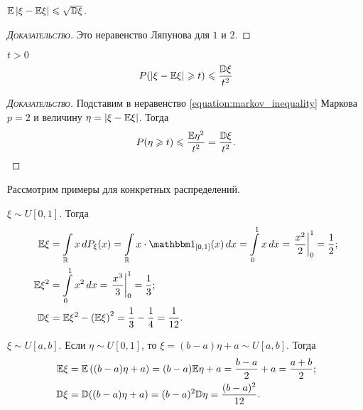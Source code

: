\documentclass[../main.tex]{subfiles}
\begin{document}
\begin{prop}
 $ \mathbb E \left| \xi - \mathbb E\xi \right| \leqslant \sqrt{\mathbb D\xi} $.
\end{prop}
\begin{proof}[\normalfont\textsc{Доказательство}]
 Это неравенство Ляпунова для $ 1 $ и $ 2 $.
\end{proof}

\begin{prop}
 \label{proposition:chebyshev_inequality}
 $ t > 0 $
 \begin{align}
  \label{equation:chebyshev_inequality}
  P(\left| \xi - \mathbb E\xi \right| \geqslant t) \leqslant \frac{\mathbb D\xi}{t^{2}}
 \end{align} 
\end{prop}
\begin{proof}[\normalfont\textsc{Доказательство}]
 Подставим в неравенство \eqref{equation:markov_inequality} Маркова $ p=2 $ и величину $ \eta = \left| \xi - \mathbb E\xi \right| $. Тогда
 \begin{align*}
  P(\eta \geqslant t) \leqslant \frac{\mathbb E\eta^{2}}{t^{2}} = \frac{\mathbb D\xi}{t^{2}}.
 \end{align*} 
\end{proof}

Рассмотрим примеры для конкретных распределений.

\begin{exmpl}
 $ \xi \sim U[0,1] $. Тогда
 \begin{align*}
  \E\xi &= \int\limits_{\R} x\,dP_\xi(x)  = \int\limits_{\R} x \cdot \Ind_{[0,1]}  (x)\,dx= \int\limits_{0}^{1} x\,dx = \left. \frac{x^{2}}{2} \right|_0^{1} = \frac{1}{2}; \\
   \E\xi^{2} &= \int\limits_{0}^{1} x^{2}\,dx = \left. \frac{x^{3}}{3}\right|_0^{1} = \frac{1}{3}; \\
    \D\xi &= \E\xi^{2} - \left( \E\xi \right)^{2} = \frac{1}{3} - \frac{1}{4} = \frac{1}{12}.
 \end{align*} 
\end{exmpl}
\begin{exmpl}
 $ \xi \sim U[a,b] $. Если $ \eta \sim U[0,1] $, то $ \xi = (b-a)\eta + a\sim U[a,b] $. Тогда
 \begin{align*}
  \mathbb E\xi &= \mathbb E \left( (b-a)\eta + a \right) = (b-a)\mathbb E\eta + a = \frac{b-a}{2} + a = \frac{a+b}{2}; \\
  \mathbb D\xi &= \mathbb D((b-a)\eta + a) = (b-a)^{2}\mathbb D\eta = \frac{(b-a)^{2}}{12}.
 \end{align*} 
\end{exmpl}
\end{document}
